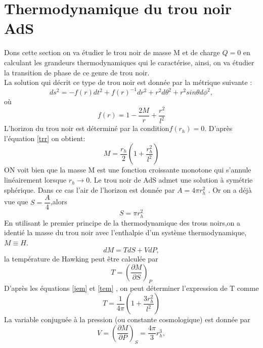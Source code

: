 \documentclass[12pt,  a4paper, openright]{report} %
\begin{document}
\section{Thermodynamique du trou noir  AdS}
Dons cette section  on va étudier le trou noir de masse M et de charge $ Q = 0 $ en calculant
les grandeurs thermodynamiques qui le caractérise, ainsi, on va étudier la transition de phase 
de ce genre de trou noir.\\
La solution qui décrit ce type de trou noir est donnée par la métrique suivante :
\begin{equation}
ds^{2}=-f(r)dt^{2}+f(r)^{-1}dr^{2}+r^{2}d\theta^{2}+r^{2}sin\theta d\phi^{2},
\end{equation}
où
\begin{equation}
\label{trr}
f(r)=1-\dfrac{2M}{r}+\dfrac{r^{2}}{l^{2}}
\end{equation}
L'horizon du trou noir est déterminé par la condition$ f(r_{h}) = 0$. D’après l’équation \ref{trr} on obtient:
\begin{equation}
\label{jem}
M=\dfrac{r_{h}}{2}(1+\dfrac{r_{h}^{2}}{l^{2}})
\end{equation}
ON voit bien que la masse M est une fonction croissante monotone qui s’annule linéairement lorsque $r_{h}\longrightarrow 0.$
Le trou noir de  AdS admet une solution  à symétrie sphérique.
Dans ce cas  l’air de l’horizon est donnée par  $A=4\pi r_{h}^{2}$ .
Or on a déjà vue que $S=\dfrac{A}{4}$,alors
\begin{equation}
\label{tem}
S=\pi r_{h}^{2}
\end{equation}
En utilisant le premier principe de la thermodynamique des trous noirs,on
a identié la masse du trou noir avec l'enthalpie d'un système thermodynamique, $M \equiv H$.
\begin{equation}
dM=TdS+VdP,
\end{equation}
la température de Hawking peut être calculée par
\begin{equation}
T=(\dfrac{\partial M}{\partial S})_{P}
\end{equation}
D'après les équations \ref{jem} et \ref{tem} , on peut déterminer l’expression de T comme
\begin{equation}
\label{fem}
T=\dfrac{1}{4\pi}(1+\dfrac{3r_{h}^{2}}{l^{2}})
\end{equation} 
La variable conjuguée à la pression (ou constante cosmologique) est donnée par
\begin{equation}
V=(\dfrac{\partial M}{\partial P})_{S} =\dfrac{4\pi}{3}r_{h}^{3},
\end{equation}
\end{document}
